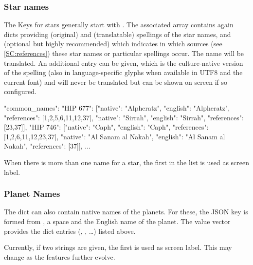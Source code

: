 \subsubsection{Star names}


The Keys for stars generally start with . 
The associated array contains again dicts providing  (original) and 
 (translatable) spellings of the star names, 
and  (optional but highly recommended) which indicates 
in which sources (see \ref{SC:references}) these star names or particular spellings occur.
The  name will be translated. An additional  entry can be given, 
which is the culture-native version of the spelling 
(also in language-specific glyphs when available in UTF8 and the current font) and will never be translated but can be shown on screen if so configured.


\begin{jsonfile}[\tiny]
"common_names": {
    "HIP 677": [{"native": "Alpheratz",         "english": "Alpheratz",         "references": [1,2,5,6,11,12,37]},
                {"native": "Sirrah",            "english": "Sirrah",            "references": [23,37]}],
    "HIP 746": [{"native": "Caph",              "english": "Caph",              "references": [1,2,6,11,12,23,37]},
                {"native": "Al Sanam al Nakah", "english": "Al Sanam al Nakah", "references": [37]}],
	... }
\end{jsonfile}

When there is more than one name for a star, the first in the list is used as screen label. 


\subsubsection{Planet Names}
\label{sec:skycultures:planetnames}

The   dict can also contain native names of the planets. 
For these, the JSON key is formed from , a space and the English name of the planet. 
The value vector provides the dict entries (, , \ldots) listed above. 

Currently, if two  strings are given, the first is used as screen label. This may change as the features further evolve.


